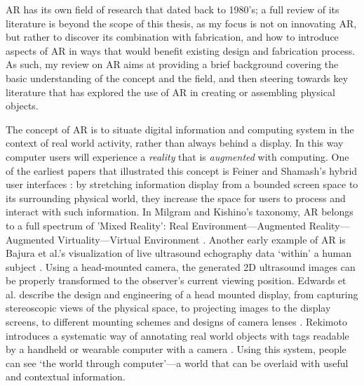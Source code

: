 AR has its own field of research that dated back to 1980's; a full review of its literature is beyond the scope of this thesis, as my focus is not on innovating AR, but rather to discover its combination with fabrication, and how to introduce aspects of AR in ways that would benefit existing design and fabrication process. As such, my review on AR aims at providing a brief background covering the basic understanding of the concept and the field, and then steering towards key literature that has explored the use of AR in creating or assembling physical objects.

The concept of AR is to situate digital information and computing system in the context of real world activity, rather than always behind a display. In this way computer users will experience a \textit{reality} that is \textit{augmented} with computing. One of the earliest papers that illustrated this concept is Feiner and Shamash's hybrid user interfaces \cite{feiner1991hybrid}: by stretching information display from a bounded screen space to its surrounding physical world, they increase the space for users to process and interact with such information. In Milgram and Kishino's taxonomy, AR belongs to a full spectrum of 'Mixed Reality': Real Environment---Augmented Reality---Augmented Virtuality---Virtual Environment \cite{milgram1994taxonomy}. Another early example of AR is Bajura et al.'s visualization of live ultrasound echography data `within' a human subject \cite{bajura1992merging}. Using a head-mounted camera, the generated 2D ultrasound images can be properly transformed to the observer’s current viewing position. Edwards et al. describe the design and engineering of a head mounted display, from capturing stereoscopic views of the physical space, to projecting images to the display screens, to different mounting schemes and designs of camera lenses \cite{edwards1993video}. Rekimoto introduces a systematic way of annotating real world objects with tags readable by a handheld or wearable computer with a camera \cite{rekimoto1995world}. Using this system, people can see `the world through computer'---a world that can be overlaid with useful and contextual information.

